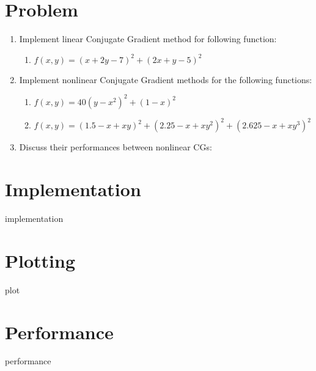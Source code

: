 \documentclass[12pt,letterpaper]{article}
\begin{document}
\section*{Problem}

\begin{enumerate}
  \item Implement linear Conjugate Gradient method for following function:
  \begin{enumerate}
    \item $f(x, y)=(x+2y-7)^2 + (2x+y-5)^2 $
  \end{enumerate}
  \item Implement nonlinear Conjugate Gradient methods for the following functions:
  \begin{enumerate}
    \item $f(x,y)=40(y-x^2)^2 + (1-x)^2$
    \item $f(x,y)=(1.5-x+xy)^2 + (2.25-x+xy^2)^2 + (2.625-x+xy^3)^2$
  \end{enumerate}
  \item Discuss their performances between nonlinear CGs:
\end{enumerate}

\section*{Implementation}
{implementation}

\newpage
\section*{Plotting}
{plot}

\newpage
\section*{Performance}
{performance}

\printbibliography
\end{document}
